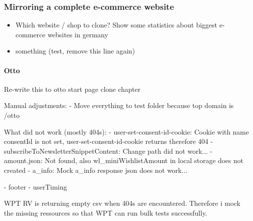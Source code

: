 







\subsubsection{Mirroring a complete e-commerce website}





\begin{itemize}
\item Which website / shop to clone? Show some statistics about biggest e-commerce websites in germany
\item something (test, remove this line again)
\end{itemize}

\paragraph{Otto}

Re-write this to otto start page clone chapter

Manual adjustments:
- Move everything to test folder because top domain is /otto

What did not work (mostly 404s):
- user-set-consent-id-cookie: Cookie with name consentId is not set, user-set-consent-id-cookie returns therefore 404
- subscribeToNewsletterSnippetContent: Change path did not work...
- amount.json: Not found, also wl\_miniWishlistAmount in local storage does not created
- a\_info: Mock a\_info response json does not work...

- footer
- userTiming


WPT RV is returning empty csv when 404s are encountered.
Therefore i mock the missing ressources so that WPT can run bulk tests successfully.

